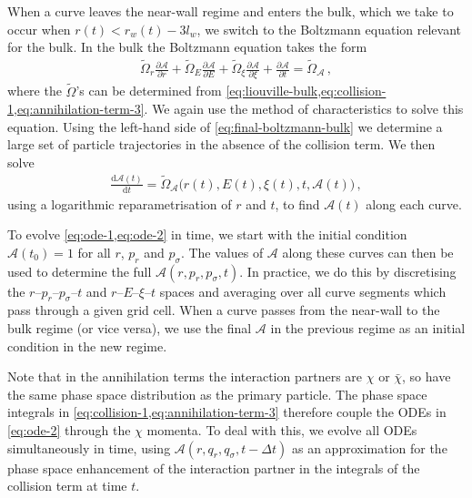 \documentclass[
onecolumn, %
11pt, %
tightenlines,
superscriptaddress, %
nofootinbib, %
preprintnumbers, %
prd %
]{revtex4-1}
\newcommand{\pd}[2]{\frac{\partial #1}{\partial #2}}                  %
\newcommand{\td}[2]{\frac{\mathrm d #1}{\mathrm d #2}}                %
\newcommand{\A}{\ensuremath{\mathcal A}\xspace}
\begin{document}
When a curve leaves the near-wall regime and enters the bulk, which we take to occur when $r(t) < r_w(t)-3 l_w$, we switch to the Boltzmann equation relevant for the bulk.  In the bulk the Boltzmann equation takes the form
%
\begin{align}
  \tilde\Omega_{r}\pd{\A}{ r} + \tilde\Omega_{E}\pd{\A}{E} + \tilde\Omega_{\xi}\pd{\A}{\xi} 
  + \pd{\A}{t}
        = \tilde\Omega_\A\,,
  \label{eq:final-boltzmann-bulk}
\end{align}
%
where the $\tilde\Omega$'s can be determined from \cref{eq:liouville-bulk,eq:collision-1,eq:annihilation-term-3}.  We again use the method of characteristics to solve this equation.  Using the left-hand side of \cref{eq:final-boltzmann-bulk} we determine a large set of particle trajectories in the absence of the collision term.  We then solve
%
\begin{align}
    \label{eq:ode-2}
    \td{\A(t)}{t} = \tilde\Omega_\A \big(r(t), E(t), \xi(t), t,\A(t) \big)\,,
\end{align}
%
using a logarithmic reparametrisation of $r$ and $t$, to find $\A(t)$ along each curve.

To evolve \cref{eq:ode-1,eq:ode-2} in time, we start with the initial condition $\A(t_0) = 1$ for all $r$, $p_r$ and $p_\sigma$.  The values of $\A$ along these curves can then be used to determine the full $\A(r,p_r, p_\sigma,t)$.  In practice, we do this by discretising the $r$--$p_r$--$p_\sigma$--$t$ and $r$--$E$--$\xi$--$t$ spaces and averaging over all curve segments which pass through a given grid cell.  When a curve passes from the near-wall to the bulk regime (or vice versa), we use the final $\A$ in the previous regime as an initial condition in the new regime.

Note that in the annihilation terms the interaction partners are $\chi$ or $\bar\chi$, so have the same phase space distribution as the primary particle. The phase space integrals in \cref{eq:collision-1,eq:annihilation-term-3} therefore couple the ODEs in \cref{eq:ode-2} through the $\chi$ momenta.  To deal with this, we evolve all ODEs simultaneously in time, using $\A(r,q_r,q_\sigma,t-\Delta t)$ as an approximation for the phase space enhancement of the interaction partner in the integrals of the collision term at time $t$.
\end{document}
